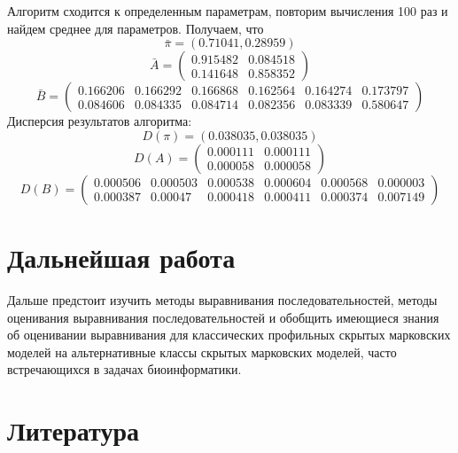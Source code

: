 \documentclass[]{article}
\begin{document}
			Алгоритм сходится к определенным параметрам, повторим вычисления 100 раз и найдем среднее для параметров. Получаем, что 
			\[
				\bar{\pi} = (0.71041, 0.28959)
			\]
			\[
			\bar{A} = 
			\begin{pmatrix}
				0.915482 & 0.084518\\
				0.141648 & 0.858352
			\end{pmatrix}
			\]
			\[
			\bar{B}	=
			\begin{pmatrix}
				0.166206 & 0.166292 & 0.166868 & 0.162564 & 0.164274 & 0.173797\\ 
				0.084606 & 0.084335 & 0.084714 & 0.082356 & 0.083339 & 0.580647 
			\end{pmatrix}
			\]				
			Дисперсия результатов алгоритма:
			\[
			D(\pi) = (0.038035, 0.038035)
			\]
			\[
			D(A) = 
			\begin{pmatrix}
				0.000111 & 0.000111\\
				0.000058 & 0.000058
			\end{pmatrix}
			\]
			\[
			D(B) =
			\begin{pmatrix}
				0.000506 & 0.000503 & 0.000538 & 0.000604& 0.000568 & 0.000003\\ 
				0.000387 & 0.00047 & 0.000418 & 0.000411 & 0.000374 & 0.007149 
			\end{pmatrix}
			\]
	
	\section{Дальнейшая работа}	
		Дальше предстоит изучить методы выравнивания последовательностей, методы оценивания выравнивания последовательностей и обобщить имеющиеся знания об оценивании выравнивания для классических профильных скрытых марковских моделей на альтернативные классы скрытых марковских моделей, часто встречающихся в задачах биоинформатики.  
		
	\section{Литература}
	\renewcommand{\refname}{}
	\vspace{-25pt}
	
	
			
		
		

	
	
	
	
	
	
	
\end{document}
